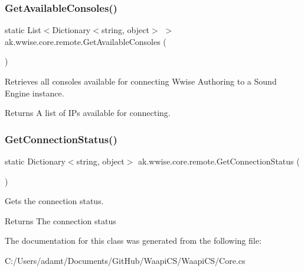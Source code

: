 \subsubsection{\texorpdfstring{Get\+Available\+Consoles()}{GetAvailableConsoles()}}
{\footnotesize\ttfamily static List$<$Dictionary$<$string, object$>$ $>$ ak.\+wwise.\+core.\+remote.\+Get\+Available\+Consoles (\begin{DoxyParamCaption}{ }\end{DoxyParamCaption})\hspace{0.3cm}{\ttfamily [static]}}



Retrieves all consoles available for connecting Wwise Authoring to a Sound Engine instance. 

\begin{DoxyReturn}{Returns}
A list of I\+Ps available for connecting.
\end{DoxyReturn}
\mbox{\label{classak_1_1wwise_1_1core_1_1remote_a3645a2f8e771b212ef0b96297d3637bb}} 
\subsubsection{\texorpdfstring{Get\+Connection\+Status()}{GetConnectionStatus()}}
{\footnotesize\ttfamily static Dictionary$<$string, object$>$ ak.\+wwise.\+core.\+remote.\+Get\+Connection\+Status (\begin{DoxyParamCaption}{ }\end{DoxyParamCaption})\hspace{0.3cm}{\ttfamily [static]}}



Gets the connection status. 

\begin{DoxyReturn}{Returns}
The connection status
\end{DoxyReturn}


The documentation for this class was generated from the following file\+:\begin{DoxyCompactItemize}
\item 
C\+:/\+Users/adamt/\+Documents/\+Git\+Hub/\+Waapi\+C\+S/\+Waapi\+C\+S/Core.\+cs\end{DoxyCompactItemize}
